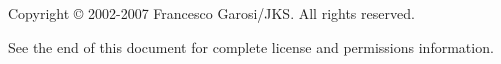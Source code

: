 Copyright \copyright{} 2002-2007 Francesco Garosi/JKS.
All rights reserved.

See the end of this document for complete license and permissions
information.
